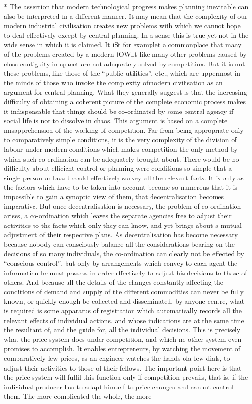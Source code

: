 \documentclass[11pt,openany]{book}
\begin{document}
* The assertion that modern technological progress makes planning inevitable can also be interpreted in a different manner. It may mean that the complexity of our modern industrial civilisation creates new problems with which we cannot hope to deal effectively except by central planning. In a sense this is true-yet not in the wide sense in which it is claimed. It iSt for examplet a commonplace that many of the problems created by a modern tOWllt like many other problems caused by close contiguity in spacet are not adequately solved by competition. But it is not these problems, like those of the ``public utilities'', etc., which are uppermost in the minds of those who invoke the complexity ofmodern civilisation as an argument for central planning. What they generally suggest is that the increasing difficulty of obtaining a coherent picture of the complete economic process makes it indispensable that things should be co-ordinated by some central agency if social life is not to dissolve in chaos. This argument is based on a complete misapprehension of the working of competition. Far from being appropriate only to comparatively simple conditions, it is the very complexity of the division of labour under modern conditions which makes competition the only method by which such co-ordination can be adequately brought about. There would be no difficulty about efficient control or planning were conditions so simple that a single person or board could effectively survey all the relevant facts. It is only as the factors which have to be taken into account become so numerous that it is impossible to gain a synoptic view of them, that decentralisation becomes imperative. But once decentralisation is necessary, the problem of co-ordination arises, a co-ordination which leaves the separate agencies free to adjust their activities to the facts which only they can know, and yet brings about a mutual adjustment of their respective plans. As decentralisation has become necessary because nobody can consciously balance all the considerations bearing on the decisions of so many individuals, the co-ordination can clearly not be effected by ``conscious control'', but only by arrangements which convey to each agent the information he must possess in order effectively to adjust his decisions to those of others. And because all the details of the changes constantly affecting the conditions of demand and supply of the different commodities can never be fully known, or quickly enough be collected and disseminated, by anyone centre, what is required is some apparatus of registration which automatically records all the relevant effects of individual actions, and whose indications are at the same time the resultant of, and the guide for, all the individual decisions. This is precisely what the price system does under competition, and which no other system even promises to accomplish. It enables entrepreneurs, by watching the movement of comparatively few prices, as an engineer watches the hands ofa few dials, to adjust their activities to those of their fellows. The important point here is that the price system will fulfil this function only if competition prevails, that is, if the individual producer has to adapt himself to price changes and cannot control them. The more complicated the whole, the more 
\end{document}

